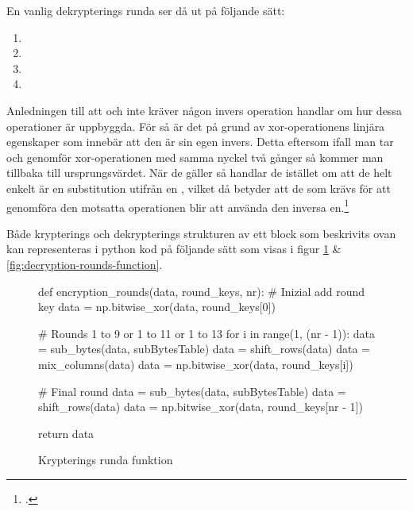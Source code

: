 En vanlig dekrypterings runda ser då ut på följande sätt:

\begin{enumerate}
    \item {}
    \item {}
    \item {}
    \item {}
\end{enumerate}

Anledningen till att  och  inte kräver någon invers operation handlar om hur dessa operationer
är uppbyggda. För  så är det på grund av \gls{xor}-operationens linjära egenskaper som innebär att den är sin egen invers.
Detta eftersom ifall man tar och genomför \gls{xor}-operationen med samma nyckel två gånger så kommer man tillbaka till ursprungsvärdet. När de gäller 
så handlar de istället om att de helt enkelt är en substitution utifrån en , vilket då betyder att de som krävs för att genomföra den motsatta operationen
blir att använda den inversa en.\footcite{daemen1999aes}

Både krypterings och dekrypterings strukturen av ett block som beskrivits ovan kan representeras i \gls{python} kod på följande sätt som visas i figur \ref{fig:encryption-rounds-function} \& \ref{fig:decryption-rounds-function}.

\begin{figure}[h]
    \centering
    \begin{python}
    def encryption_rounds(data, round_keys, nr):
        # Inizial add round key
        data = np.bitwise_xor(data, round_keys[0])

        # Rounds 1 to 9 or 1 to 11 or 1 to 13
        for i in range(1, (nr - 1)):
            data = sub_bytes(data, subBytesTable)
            data = shift_rows(data)
            data = mix_columns(data)
            data = np.bitwise_xor(data, round_keys[i])

        # Final round
        data = sub_bytes(data, subBytesTable)
        data = shift_rows(data)
        data = np.bitwise_xor(data, round_keys[nr - 1])

        return data
    \end{python}
    \caption{Krypterings runda funktion}
    \label{fig:encryption-rounds-function}
\end{figure}

